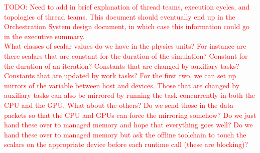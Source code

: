 \documentclass{article}
\begin{document}
\textcolor{red}{TODO: Need to add in brief explanation of thread teams,
execution cycles, and topologies of thread teams.  This document should
eventually end up in the Orchestration System design document, in which case
this information could go in the executive summary.}\\

\textcolor{red}{What classes of scalar values do we have in the physics units?
For instance are there scalars that are constant for the duration of the
simulation?  Constant for the duration of an iteration?  Constants that are
changed by auxiliary tasks?  Constants that are updated by work tasks?  For the
first two, we can set up mirrors of the variable between host and devices.
Those that are changed by auxiliary tasks can also be mirrored by running the
task concurrently in both the CPU and the GPU.  What about the others?  Do we
send those in the data packets so that the CPU and GPUs can force the mirroring
somehow?  Do we just hand these over to managed memory and hope that everything
goes well?  Do we hand these over to managed memory but ask the offline
toolchain to touch the scalars on the appropriate device before each runtime
call (these are blocking)?}
\end{document}
